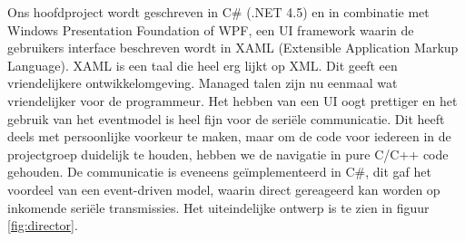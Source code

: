 \documentclass{report}
\begin{document}
Ons hoofdproject wordt geschreven in C\# (.NET 4.5) en in combinatie met Windows Presentation Foundation of WPF, een UI framework waarin de gebruikers interface beschreven wordt in XAML (Extensible Application Markup Language).
XAML is een taal die heel erg lijkt op XML.
Dit geeft een vriendelijkere ontwikkelomgeving.
Managed talen zijn nu eenmaal wat vriendelijker voor de programmeur.
Het hebben van een UI oogt prettiger en het gebruik van het eventmodel is heel fijn voor de seriële communicatie.
Dit heeft deels met persoonlijke voorkeur te maken, maar om de code voor iedereen in de projectgroep duidelijk te houden, hebben we de navigatie in pure C/C++ code gehouden.
De communicatie is eveneens geïmplementeerd in C\#, dit gaf het voordeel van een event-driven model, waarin direct gereageerd kan worden op inkomende seriële transmissies. Het uiteindelijke ontwerp is te zien in figuur \ref{fig:director}.
\end{document}
